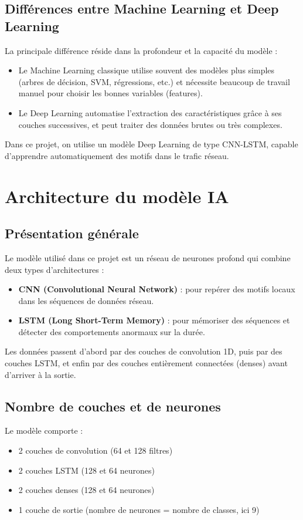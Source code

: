 \documentclass[a4paper,12pt]{article}
\begin{document}
\subsection{Différences entre Machine Learning et Deep Learning}
La principale différence réside dans la profondeur et la capacité du modèle :
\begin{itemize}
  \item Le Machine Learning classique utilise souvent des modèles plus simples (arbres de décision, SVM, régressions, etc.) et nécessite beaucoup de travail manuel pour choisir les bonnes variables (features).
  \item Le Deep Learning automatise l'extraction des caractéristiques grâce à ses couches successives, et peut traiter des données brutes ou très complexes.
\end{itemize}
Dans ce projet, on utilise un modèle Deep Learning de type CNN-LSTM, capable d'apprendre automatiquement des motifs dans le trafic réseau.

\section{Architecture du modèle IA}

\subsection{Présentation générale}
Le modèle utilisé dans ce projet est un réseau de neurones profond qui combine deux types d'architectures :
\begin{itemize}
  \item \textbf{CNN (Convolutional Neural Network)} : pour repérer des motifs locaux dans les séquences de données réseau.
  \item \textbf{LSTM (Long Short-Term Memory)} : pour mémoriser des séquences et détecter des comportements anormaux sur la durée.
\end{itemize}
Les données passent d'abord par des couches de convolution 1D, puis par des couches LSTM, et enfin par des couches entièrement connectées (denses) avant d'arriver à la sortie.

\subsection{Nombre de couches et de neurones}
Le modèle comporte :
\begin{itemize}
  \item 2 couches de convolution (64 et 128 filtres)
  \item 2 couches LSTM (128 et 64 neurones)
  \item 2 couches denses (128 et 64 neurones)
  \item 1 couche de sortie (nombre de neurones = nombre de classes, ici 9)
\end{itemize}
\end{document}

